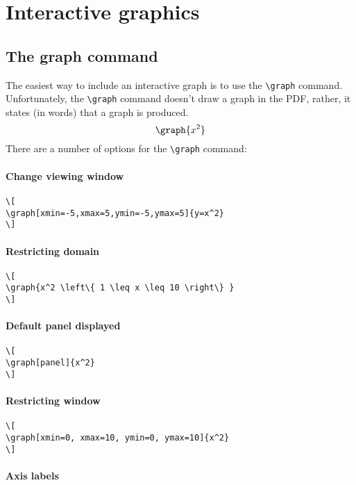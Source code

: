 \documentclass{ximera}
\begin{document}
\section{Interactive graphics}


\subsection{The graph command}

The easiest way to include an interactive graph is to use the
\verb|\graph| command. Unfortunately, the \verb|\graph| command
doesn't draw a graph in the PDF, rather, it states (in words) that a
graph is produced.
\[
\graph{x^2}
\]
There are a number of options for the \verb|\graph| command:


\paragraph{Change viewing window}

  
\begin{verbatim}
\[
\graph[xmin=-5,xmax=5,ymin=-5,ymax=5]{y=x^2}
\]
\end{verbatim}
\paragraph{Restricting domain}


\begin{verbatim}
\[
\graph{x^2 \left\{ 1 \leq x \leq 10 \right\} }
\]
\end{verbatim}
\paragraph{Default panel displayed}

  
\begin{verbatim}
\[
\graph[panel]{x^2}
\]
\end{verbatim}
\paragraph{Restricting window}

  
\begin{verbatim}
\[
\graph[xmin=0, xmax=10, ymin=0, ymax=10]{x^2}
\]
\end{verbatim}
\paragraph{Axis labels}
\end{document}
